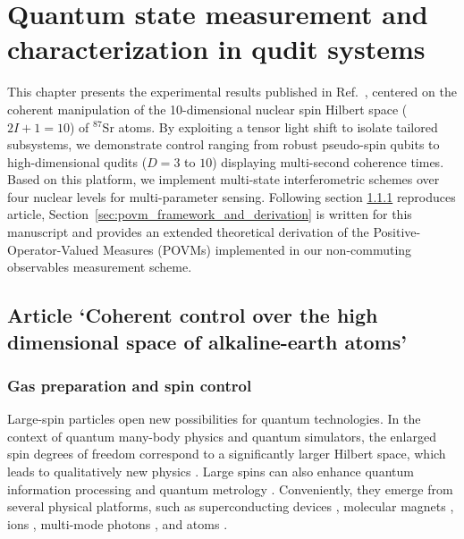 \chapter{Quantum state measurement and characterization in qudit systems \label{cha:litreivew}}
\label{chap 2}

This chapter presents the experimental results published in Ref.~\cite{ahmed_coherent_2025}, centered on the coherent manipulation of the 10-dimensional nuclear spin Hilbert space ($2I+1 = 10$) of $^{87}\text{Sr}$ atoms. By exploiting a tensor light shift to isolate tailored subsystems, we demonstrate control ranging from robust pseudo-spin qubits to high-dimensional qudits ($D=3$ to $10$) displaying multi-second coherence times. Based on this platform, we implement multi-state interferometric schemes over four nuclear levels for multi-parameter sensing. Following section \ref{Sec:Gas_preparation_and_spin_control} reproduces article, Section~\ref{sec:povm_framework_and_derivation} is written for this manuscript and provides an extended theoretical derivation of the Positive-Operator-Valued Measures (POVMs) implemented in our non-commuting observables measurement scheme.


\section{Article `Coherent control over the high dimensional space of alkaline-earth atoms' \cite{ahmed_coherent_2025}}
\subsection{Gas preparation and spin control}

\label{Sec:Gas_preparation_and_spin_control}
Large-spin particles open new possibilities for quantum technologies. In the context of quantum many-body physics and quantum simulators, the enlarged spin degrees of freedom correspond to a significantly larger Hilbert space, which leads to qualitatively new physics \cite{Klempt2010pao, Krauser2012cmf, Taie2012asm, depaz2013nqm, Pagano2014aod, Patscheider2020cde, Alaoui2022mcf}. Large spins can also enhance quantum information processing \cite{Kiktenko2015sqr} and quantum metrology \cite{Fernholz2008sso, Hamley2012sns, Kajtoch2016ssi, Chalopin2018qes}. Conveniently, they emerge from several physical platforms, such as superconducting devices \cite{Peterer2015cad, Svetitsky2014htq}, molecular magnets \cite{Godfrin2018gri}, ions \cite{Randall2015epa}, multi-mode photons \cite{Lanyon2008sql}, and atoms \cite{StamperKurnsbg2013, Chomaz2022dpa}. 

